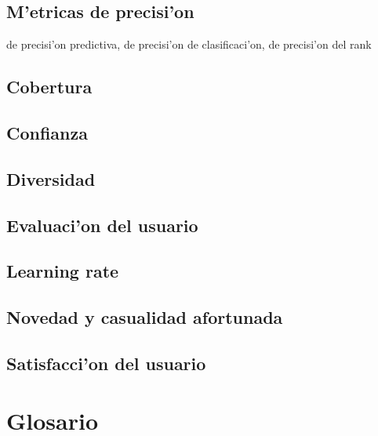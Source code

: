 \documentclass[11pt]{article}
\begin{document}
\subsection{M'etricas de precisi'on}
de precisi'on predictiva, de precisi'on de clasificaci'on, de precisi'on del rank

\subsection{Cobertura}

\subsection{Confianza}

\subsection{Diversidad}

\subsection{Evaluaci'on del usuario}

\subsection{Learning rate}

\subsection{Novedad y casualidad afortunada}

\subsection{Satisfacci'on del usuario}


\newpage
\appendix
\section{Glosario}
\end{document}
